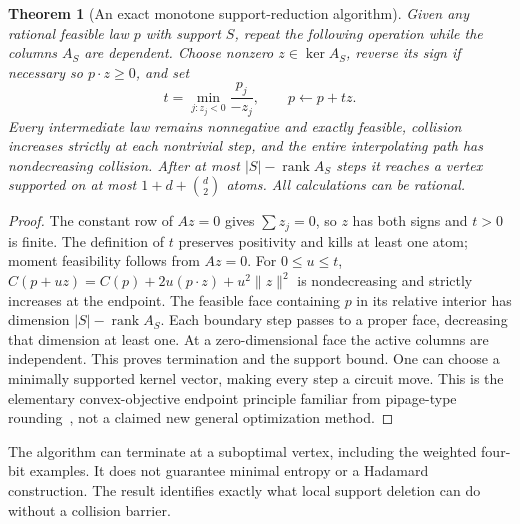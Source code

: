 \documentclass[11pt]{article}
\newtheorem{theorem}{Theorem}[section]
\begin{document}
\begin{theorem}[An exact monotone support-reduction algorithm]
Given any rational feasible law $p$ with support $S$, repeat the
following operation while the columns $A_S$ are dependent.
Choose nonzero $z\in\ker A_S$, reverse its sign if necessary so
$p\cdot z\ge0$, and set
\[
 t=\min_{j:z_j<0}\frac{p_j}{-z_j},\qquad p\leftarrow p+tz.
\]
Every intermediate law remains nonnegative and exactly feasible,
collision increases strictly at each nontrivial step, and the entire
interpolating path has nondecreasing collision. After at most
$|S|-\operatorname{rank}A_S$ steps it reaches a vertex supported on
at most $1+d+\binom d2$ atoms. All calculations can be rational.
\end{theorem}
\begin{proof}
The constant row of $Az=0$ gives $\sum z_j=0$, so $z$ has both
signs and $t>0$ is finite. The definition of $t$ preserves positivity
and kills at least one atom; moment feasibility follows from $Az=0$.
For $0\le u\le t$,
$C(p+uz)=C(p)+2u(p\cdot z)+u^2\|z\|^2$ is nondecreasing and
strictly increases at the endpoint. The feasible face containing
$p$ in its relative interior has dimension
$|S|-\operatorname{rank}A_S$. Each boundary step passes to a proper
face, decreasing that dimension at least one. At a zero-dimensional
face the active columns are independent. This proves termination
and the support bound. One can choose a minimally supported kernel
vector, making every step a circuit move. This is the elementary
convex-objective endpoint principle familiar from pipage-type
rounding~\cite{AS}, not a claimed new general optimization method.
\end{proof}
The algorithm can terminate at a suboptimal vertex, including the
weighted four-bit examples. It does not guarantee minimal entropy
or a Hadamard construction. The result identifies exactly what local
support deletion can do without a collision barrier.
\end{document}
